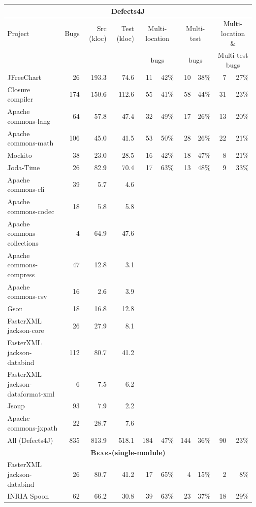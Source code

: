 \documentclass[10pt, conference]{IEEEtran}
\newcommand\bears{\textsc{Bears}\xspace}
\begin{document}
\begin{table}
\begin{center}
\begin{tabular}{l  rrr | rr | rr | rr}
\toprule
\multicolumn{10}{c}{\textbf{Defects4J}} \\
\midrule
Project & Bugs & Src (kloc) & Test (kloc) & \multicolumn{2}{c}{Multi-location} 
		& \multicolumn{2}{c}{Multi-test} & \multicolumn{2}{c}{Multi-location \&}\\
&&&&\multicolumn{2}{c}{bugs}&\multicolumn{2}{c}{bugs}&\multicolumn{2}{c}{Multi-test bugs}\\
\midrule
JFreeChart  & 26 & 193.3 & 74.6  & 11 & 42\% & 10 & 38\% & 7 & 27\%\\
Closure compiler & 174 & 150.6 & 112.6 & 55 & 41\% & 58 & 44\% & 31 & 23\%\\
Apache commons-lang & 64 & 57.8 & 47.4  & 32 & 49\% & 17 & 26\% & 13 & 20\%\\
Apache commons-math & 106 & 45.0 & 41.5 & 53 & 50\% & 28 & 26\% & 22 & 21\%\\
Mockito & 38 & 23.0 & 28.5 & 16 & 42\% & 18 & 47\% & 8 & 21\%\\
Joda-Time & 26 & 82.9 & 70.4 & 17 & 63\% & 13 & 48\% & 9 & 33\%\\
Apache commons-cli & 39 & 5.7 & 4.6 \\
Apache commons-codec & 18 & 5.8 & 5.8 \\
Apache commons-collections & 4 & 64.9 & 47.6 \\
Apache commons-compress & 47 & 12.8 & 3.1 \\ 
Apache commons-csv & 16 & 2.6 & 3.9 \\
Gson & 18 & 16.8 & 12.8 \\
FasterXML jackson-core & 26 & 27.9 & 8.1 \\
FasterXML jackson-databind & 112 & 80.7 & 41.2 \\
FasterXML jackson-dataformat-xml & 6 & 7.5 & 6.2 \\
Jsoup & 93 & 7.9 & 2.2 \\
Apache commons-jxpath & 22 & 28.7 & 7.6 \\
\midrule
All (Defects4J) & 835 & 813.9 & 518.1 & 184 & 47\% & 144 & 36\% & 90 & 23\%\\
\midrule
\multicolumn{10}{c}{\textbf{\bears (single-module)}} \\
\midrule
FasterXML jackson-databind & 26 & 80.7 & 41.2 & 17 & 65\% & 4 & 15\% & 2 & 8\%\\
INRIA Spoon & 62 & 66.2 & 30.8  & 39 & 63\% & 23 & 37\% & 18 & 29\%\\

\end{tabular}
\end{center}
\end{table}
\end{document}
